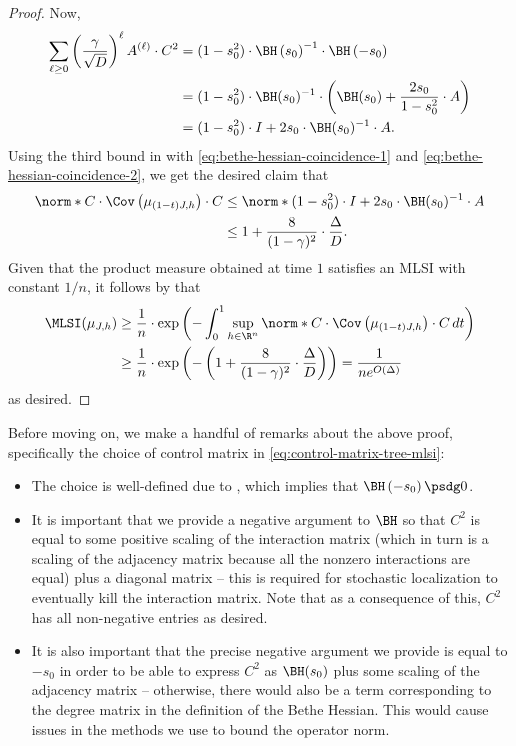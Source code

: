\documentclass[11pt,letterpaper]{article}
\begin{document}
\begin{proof}
        Now,
        \begin{align*}
            \sum_{\ell \ge 0} \left( \frac{\gamma}{\sqrt{D}} \right)^{\ell} A^{(\ell)} \cdot C^2 &= (1-s_0^2) \cdot \BH\left( s_0 \right)^{-1} \cdot \BH\left( -s_0 \right) \\
                &= (1-s_0^2) \cdot \BH(s_0)^{-1} \cdot \left( \BH(s_0) + \frac{2s_0}{1-s_0^2} \cdot A \right) \\
                &= (1-s_0^2) \cdot I + 2 s_0 \cdot \BH(s_0)^{-1} \cdot A.
        \end{align*}
        Using the third bound in  with \eqref{eq:bethe-hessian-coincidence-1} and \eqref{eq:bethe-hessian-coincidence-2}, we get the desired claim that
        \begin{align*}
            \norm*{C \cdot \Cov\left( \mu_{(1-t)J,h} \right) \cdot C} &\le \norm*{ (1-s_0^2) \cdot I + 2 s_0 \cdot \BH(s_0)^{-1} \cdot A } \\
                &\le 1 + \frac{8}{(1-\gamma)^2} \cdot \frac{\Delta}{D}.
        \end{align*}
        Given that the product measure obtained at time $1$ satisfies an MLSI with constant $1/n$, it follows by  that
        \begin{align*}
            \MLSI(\mu_{J,h}) &\ge \frac{1}{n} \cdot \exp\left( - \int_{0}^{1} \sup_{h \in \R^n} \norm*{ C \cdot \Cov\left( \mu_{(1-t)J, h} \right) \cdot C } \,dt \right) \\
                &\ge \frac{1}{n} \cdot \exp\left( - \left( 1 + \frac{8}{(1-\gamma)^2} \cdot \frac{\Delta}{D} \right) \right) = \frac{1}{ne^{O(\Delta)}}
        \end{align*}
        as desired.
    \end{proof}

    Before moving on, we make a handful of remarks about the above proof, specifically the choice of control matrix in \eqref{eq:control-matrix-tree-mlsi}:
    \begin{itemize}
        \item The choice is well-defined due to , which implies that $\BH\left(-s_0\right) \psdg 0$.
        \item It is important that we provide a negative argument to $\BH$ so that $C^2$ is equal to some positive scaling of the interaction matrix (which in turn is a scaling of the adjacency matrix because all the nonzero interactions are equal) plus a diagonal matrix -- this is required for stochastic localization to eventually kill the interaction matrix. Note that as a consequence of this, $C^2$ has all non-negative entries as desired.
        \item It is also important that the precise negative argument we provide is equal to $-s_0$ in order to be able to express $C^2$ as $\BH(s_0)$ plus some scaling of the adjacency matrix -- otherwise, there would also be a term corresponding to the degree matrix in the definition of the Bethe Hessian. This would cause issues in the methods we use to bound the operator norm. 
    \end{itemize}
\end{document}
